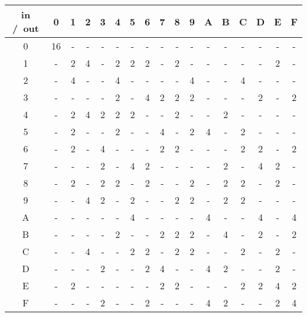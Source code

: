 \begin{tabular}{c|cccccccccccccccc}
in /\ out & 0 & 1 & 2 & 3 & 4 & 5 & 6 & 7 & 8 & 9 & A & B & C & D & E & F \\
\hline
0 & 16 & - & - & - & - & - & - & - & - & - & - & - & - & - & - & - \\
1 & - & 2 & 4 & - & 2 & 2 & 2 & - & 2 & - & - & - & - & - & 2 & - \\
2 & - & 4 & - & - & 4 & - & - & - & - & 4 & - & - & 4 & - & - & - \\
3 & - & - & - & - & 2 & - & 4 & 2 & 2 & 2 & - & - & - & 2 & - & 2 \\
4 & - & 2 & 4 & 2 & 2 & 2 & - & - & 2 & - & - & 2 & - & - & - & - \\
5 & - & 2 & - & - & 2 & - & - & 4 & - & 2 & 4 & - & 2 & - & - & - \\
6 & - & 2 & - & 4 & - & - & - & 2 & 2 & - & - & - & 2 & 2 & - & 2 \\
7 & - & - & - & 2 & - & 4 & 2 & - & - & - & - & 2 & - & 4 & 2 & - \\
8 & - & 2 & - & 2 & 2 & - & 2 & - & - & 2 & - & 2 & 2 & - & 2 & - \\
9 & - & - & 4 & 2 & - & 2 & - & - & 2 & 2 & - & 2 & 2 & - & - & - \\
A & - & - & - & - & - & 4 & - & - & - & - & 4 & - & - & 4 & - & 4 \\
B & - & - & - & - & 2 & - & - & 2 & 2 & 2 & - & 4 & - & 2 & - & 2 \\
C & - & - & 4 & - & - & 2 & 2 & - & 2 & 2 & - & - & 2 & - & 2 & - \\
D & - & - & - & 2 & - & - & 2 & 4 & - & - & 4 & 2 & - & - & 2 & - \\
E & - & 2 & - & - & - & - & - & 2 & 2 & - & - & - & 2 & 2 & 4 & 2 \\
F & - & - & - & 2 & - & - & 2 & - & - & - & 4 & 2 & - & - & 2 & 4 \\
\end{tabular}